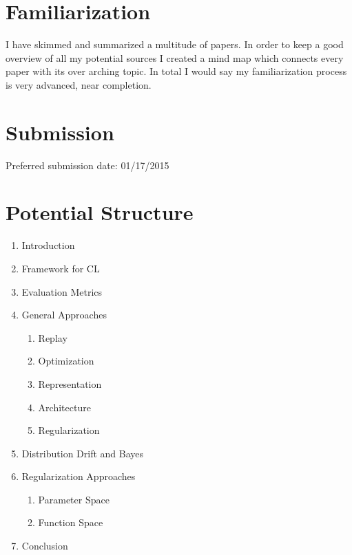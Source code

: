 \documentclass[12pt, a4paper]{report}
\begin{document}
\section*{Familiarization}
	I have skimmed and summarized a multitude of papers. In order to keep a good overview of all my potential sources I created a mind map which connects every paper with its over arching topic. In total I would say my familiarization process is very advanced, near completion.
\section*{Submission}
	Preferred submission date: 01/17/2015
\section*{Potential Structure}
\begin{enumerate}
	\item Introduction
	\item Framework for CL
	\item Evaluation Metrics
	\item General Approaches
	\begin{enumerate}
		\item Replay
		\item Optimization
		\item Representation
		\item Architecture
		\item Regularization
	\end{enumerate}
	\item Distribution Drift and Bayes
	\item Regularization Approaches
	\begin{enumerate}
		\item Parameter Space
		\item Function Space
	\end{enumerate}
	\item Conclusion
\end{enumerate}
\end{document}
